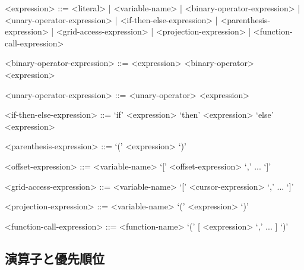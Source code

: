 \documentclass{jsarticle}
\begin{document}
\begin{grammar}
  <expression> ::= <literal> | <variable-name> |
<binary-operator-expression> |
<unary-operator-expression>  |
<if-then-else-expression>    |
<parenthesis-expression>     |
<grid-access-expression>    |
<projection-expression>    |
<function-call-expression>

<binary-operator-expression> ::= <expression> <binary-operator> <expression>

<unary-operator-expression>  ::= <unary-operator> <expression>

<if-then-else-expression>    ::= `if' <expression> `then' <expression> `else' <expression>

<parenthesis-expression>     ::= `('  <expression>  `)'

<offset-expression>          ::= <variable-name> `[' <offset-expression> `,' ... `]'

<grid-access-expression>     ::= <variable-name> `[' <cursor-expression> `,' ... `]'

<projection-expression>      ::= <variable-name> `(' <expression> `)'

<function-call-expression>   ::= <function-name> `(' [ <expression> `,' ... ] `)'
\end{grammar}



\subsection{演算子と優先順位}
\end{document}
